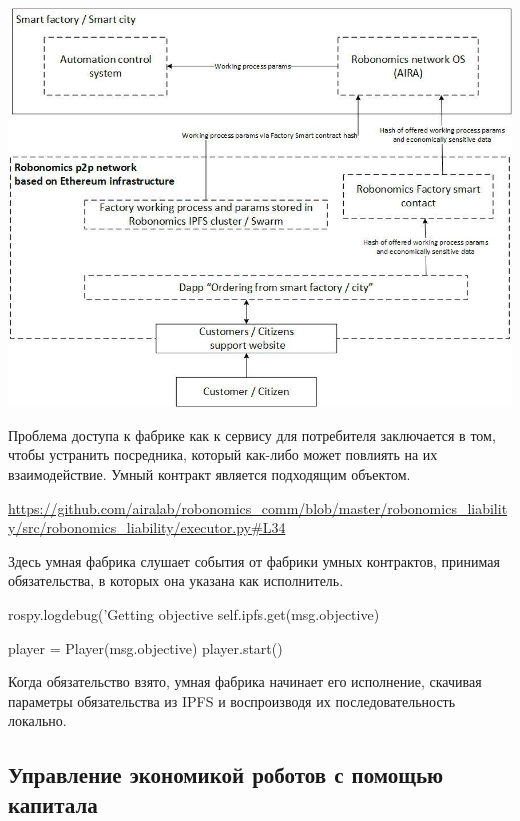 \documentclass{article}
\begin{document}
\includegraphics[width=1\textwidth]{app-2.png} 

Проблема доступа к фабрике как к сервису для потребителя заключается в том, чтобы устранить посредника, который как-либо может повлиять на их взаимодействие. Умный контракт является подходящим объектом.

\url{https://github.com/airalab/robonomics_comm/blob/master/robonomics_liability/src/robonomics_liability/executor.py#L34}

Здесь умная фабрика слушает события от фабрики умных контрактов, принимая обязательства, в которых она указана как исполнитель.

\begin{python}
rospy.logdebug('Getting objective %
self.ipfs.get(msg.objective)

player = Player(msg.objective)
player.start()
\end{python}

Когда обязательство взято, умная фабрика начинает его исполнение, скачивая параметры обязательства из IPFS и воспроизводя их последовательность локально.

\subsection{Управление экономикой роботов с помощью капитала}
\end{document}
